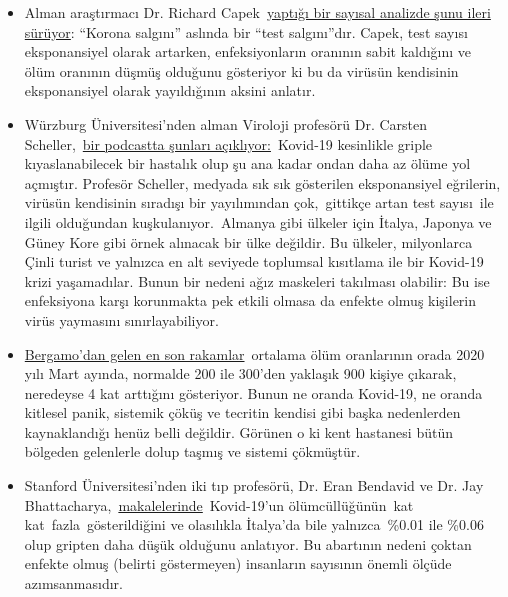 \begin{itemize}
\tightlist
\item
  Alman araştırmacı Dr. Richard
  Capek~\href{https://coronadaten.wordpress.com/}{yaptığı bir sayısal
  analizde şunu ileri sürüyor}: ``Korona salgını'' aslında bir ``test
  salgını''dır. Capek, test sayısı eksponansiyel olarak artarken,
  enfeksiyonların oranının sabit kaldığını ve ölüm oranının düşmüş
  olduğunu gösteriyor ki bu da virüsün kendisinin eksponansiyel olarak
  yayıldığının aksini anlatır.
\item
  Würzburg Üniversitesi'nden alman Viroloji profesörü Dr. Carsten
  Scheller,~\href{https://www.youtube.com/watch?v=w-uub0urNfw}{bir
  podcastta şunları açıklıyor:}~Kovid-19 kesinlikle griple
  kıyaslanabilecek bir hastalık olup şu ana kadar ondan daha az ölüme
  yol açmıştır. Profesör Scheller, medyada sık sık gösterilen
  eksponansiyel eğrilerin, virüsün kendisinin sıradışı bir yayılımından
  çok,~gittikçe artan test sayısı~ile ilgili olduğundan
  kuşkulanıyor.~Almanya gibi ülkeler için İtalya, Japonya ve Güney Kore
  gibi örnek alınacak bir ülke değildir. Bu ülkeler, milyonlarca Çinli
  turist ve yalnızca en alt seviyede toplumsal kısıtlama ile bir
  Kovid-19 krizi yaşamadılar. Bunun bir nedeni ağız maskeleri takılması
  olabilir: Bu ise enfeksiyona karşı korunmakta pek etkili olmasa da
  enfekte olmuş kişilerin virüs yaymasını sınırlayabiliyor.
\item
  \href{https://www.ecodibergamo.it/stories/bergamo-citta/a-bergamo-decessi-4-volte-oltre-la-medialeco-lancia-unindagine-nei-comuni_1346651_11/}{Bergamo'dan
  gelen en son rakamlar}~ortalama ölüm oranlarının orada 2020 yılı Mart
  ayında, normalde 200 ile 300'den yaklaşık 900 kişiye çıkarak,
  neredeyse 4 kat arttığını gösteriyor. Bunun ne oranda Kovid-19, ne
  oranda kitlesel panik, sistemik çöküş ve tecritin kendisi gibi başka
  nedenlerden kaynaklandığı henüz belli değildir. Görünen o ki kent
  hastanesi bütün bölgeden gelenlerle dolup taşmış ve sistemi çökmüştür.
\item
  Stanford Üniversitesi'nden iki tıp profesörü, Dr. Eran Bendavid ve Dr.
  Jay
  Bhattacharya,~\href{https://web.archive.org/web/20200325103650/https:/www.wsj.com/articles/is-the-coronavirus-as-deadly-as-they-say-11585088464}{makalelerinde}~Kovid-19'un
  ölümcüllüğünün~kat kat~fazla~gösterildiğini ve olasılıkla İtalya'da
  bile yalnızca~\%0.01 ile \%0.06 olup gripten daha düşük olduğunu
  anlatıyor. Bu abartının nedeni çoktan enfekte olmuş (belirti
  göstermeyen) insanların sayısının önemli ölçüde azımsanmasıdır.

\end{itemize}

